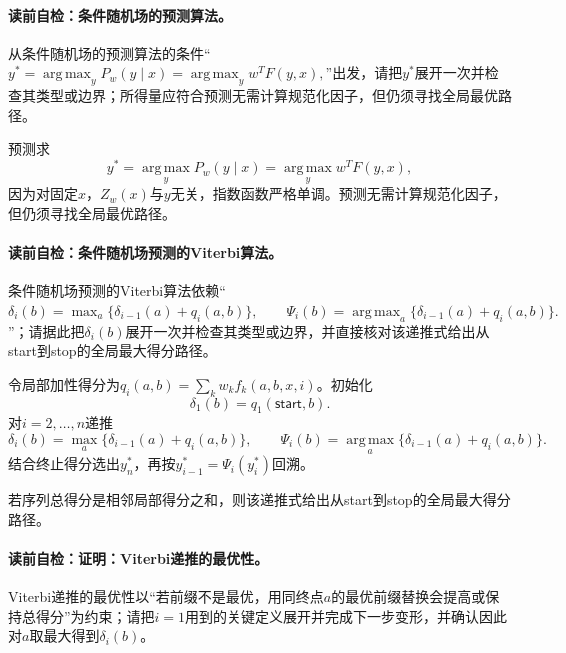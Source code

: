 \paragraph{读前自检：条件随机场的预测算法。}从条件随机场的预测算法的条件“$y^*=\operatorname*{arg\,max}_yP_w(y\mid x) =\operatorname*{arg\,max}_y w^TF(y,x),$”出发，请把$y^*$展开一次并检查其类型或边界；所得量应符合预测无需计算规范化因子，但仍须寻找全局最优路径。\par

预测求
\[
y^*=\operatorname*{arg\,max}_yP_w(y\mid x)
=\operatorname*{arg\,max}_y w^TF(y,x),
\]
因为对固定$x$，$Z_w(x)$与$y$无关，指数函数严格单调。预测无需计算规范化因子，但仍须寻找全局最优路径。

\paragraph{读前自检：条件随机场预测的Viterbi算法。}条件随机场预测的Viterbi算法依赖“$\delta_i(b)=\max_a\{\delta_{i-1}(a)+q_i(a,b)\},\qquad \Psi_i(b)=\operatorname*{arg\,max}_a\{\delta_{i-1}(a)+q_i(a,b)\}.$”；请据此把$\delta_i(b)$展开一次并检查其类型或边界，并直接核对该递推式给出从start到stop的全局最大得分路径。\par

令局部加性得分为$q_i(a,b)=\sum_kw_kf_k(a,b,x,i)$。初始化
\[
\delta_1(b)=q_1(\mathsf{start},b).
\]
对$i=2,\ldots,n$递推
\[
\delta_i(b)=\max_a\{\delta_{i-1}(a)+q_i(a,b)\},\qquad
\Psi_i(b)=\operatorname*{arg\,max}_a\{\delta_{i-1}(a)+q_i(a,b)\}.
\]
结合终止得分选出$y_n^*$，再按$y_{i-1}^*=\Psi_i(y_i^*)$回溯。

\begin{theorem}[Viterbi递推的最优性]\label{thm:V3-C06-viterbi}
若序列总得分是相邻局部得分之和，则该递推式给出从start到stop的全局最大得分路径。
\end{theorem}
\paragraph{读前自检：证明：Viterbi递推的最优性。}Viterbi递推的最优性以“若前缀不是最优，用同终点$a$的最优前缀替换会提高或保持总得分”为约束；请把$i=1$用到的关键定义展开并完成下一步变形，并确认因此对$a$取最大得到$\delta_i(b)$。\par

